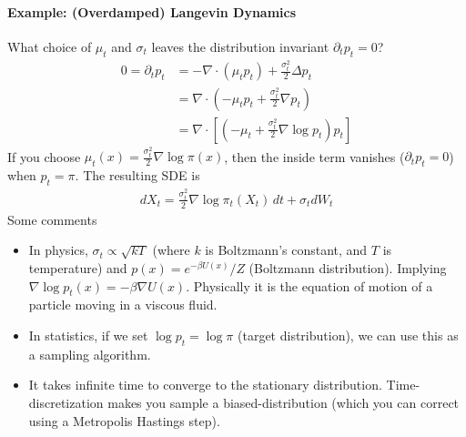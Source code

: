 \paragraph{Example: (Overdamped) Langevin Dynamics} What choice of $\mu_t$ and $\sigma_t$ leaves the distribution invariant $\partial_t p_t = 0$?
\begin{align}
	0 = \partial_t p_t & = -\nabla \cdot (\mu_t p_t) + \frac{\sigma_t^2}{2} \Delta p_t\\
	& = \nabla \cdot (- \mu_t p_t + \frac{\sigma_t^2}{2} \nabla p_t)\\
	& = \nabla \cdot [(- \mu_t + \frac{\sigma_t^2}{2} \nabla \log p_t ) p_t]
\end{align}
If you choose $\mu_t(x) = \frac{\sigma_t^2}{2} \nabla \log \pi(x)$, then the inside term vanishes ($\partial_t p_t = 0$) when $p_t = \pi$. The resulting SDE is
\begin{align}
	dX_t = \frac{\sigma_t^2}{2}\nabla \log \pi_t(X_t) \, dt + \sigma_t dW_t
\end{align}
Some comments
\begin{itemize}
	\item In physics, $\sigma_t \propto \sqrt{kT}$ (where $k$ is Boltzmann's constant, and $T$ is temperature) and  $p(x) = e^{-\beta U(x)} / Z$ (Boltzmann distribution). Implying $\nabla \log p_t(x) = - \beta \nabla U(x)$. Physically it is the equation of motion of a particle moving in a viscous fluid.
	\item In statistics, if we set $\log p_t = \log \pi$ (target distribution), we can use this as a sampling algorithm. 
	\item It takes infinite time to converge to the stationary distribution. Time-discretization makes you sample a biased-distribution (which you can correct using a Metropolis Hastings step).
\end{itemize}


